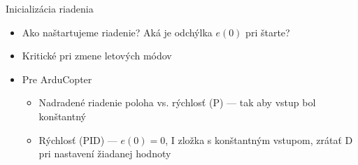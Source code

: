 

\begin{frame}[t]{Inicializácia riadenia}
\begin{itemize}
  \item<1-> Ako naštartujeme riadenie? Aká je odchýlka $e(0)$ pri štarte?
  \item<2-> Kritické pri zmene letových módov \citep{AP:PID,Bresciani2020}
  \item<3-> Pre ArduCopter \citep{AP:PID}
    \begin{itemize}
    \item Nadradené riadenie poloha vs. rýchlosť (P) --- tak aby vstup bol konštantný
    \item Rýchlosť (PID) --- $e(0)=0$, I zložka s konštantným vstupom, zrátať D pri nastavení žiadanej hodnoty
\end{itemize}

\end{itemize}
\end{frame} 



%
%



